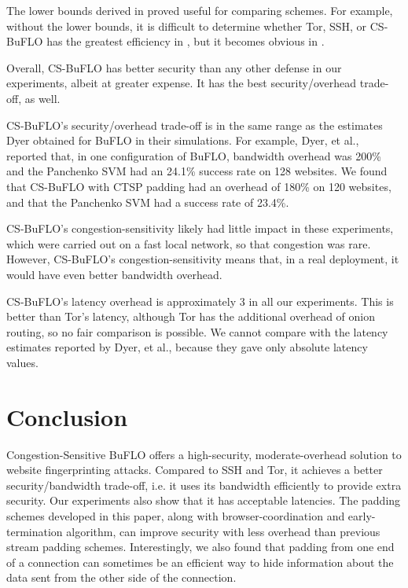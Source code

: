 \documentclass[10pt,journal]{IEEEtran}
\newcommand{\buflo} {BuFLO\xspace}
\newcommand{\csbuflo} {Congestion-Sensitive BuFLO\xspace}
\newcommand{\csb} {CS-BuFLO\xspace}
\begin{document}
The lower bounds derived in  proved useful for
comparing schemes.  For example, without the lower bounds, it is
difficult to determine whether Tor, SSH, or \csb has the greatest
efficiency in , but it becomes obvious in
.  



Overall, \csb has better security than any other defense in our
experiments, albeit at greater expense.  It has the best
security/overhead trade-off, as well.


\csb's security/overhead trade-off is in the same range as the
estimates Dyer obtained for \buflo in their simulations.  For example,
Dyer, et al., reported that, in one configuration of \buflo, bandwidth
overhead was 200\% and the Panchenko SVM had an 24.1\% success rate on
128 websites.  We found that \csb with CTSP padding had an overhead of
180\% on 120 websites, and that the Panchenko SVM had a success rate
of 23.4\%.

\csb's congestion-sensitivity likely had little impact in these
experiments, which were carried out on a fast local network, so that
congestion was rare.  However, \csb's congestion-sensitivity means
that, in a real deployment, it would have even better bandwidth
overhead.

\csb's latency overhead is approximately 3 in all our experiments.
This is better than Tor's latency, although Tor has the additional
overhead of onion routing, so no fair comparison is possible.  We
cannot compare with the latency estimates reported by Dyer, et al.,
because they gave only absolute latency values.

\section{Conclusion}
\label{sec:conclusion}

\csbuflo offers a high-security, moderate-overhead solution to website
fingerprinting attacks.  Compared to SSH and Tor, it achieves a better
security/bandwidth trade-off, i.e. it uses its bandwidth efficiently
to provide extra security.  Our experiments also show that it has
acceptable latencies.  The padding schemes developed in this paper,
along with browser-coordination and early-termination algorithm, can
improve security with less overhead than previous stream padding
schemes.  Interestingly, we also found that padding from one end of a
connection can sometimes be an efficient way to hide information about
the data sent from the other side of the connection.
\end{document}
